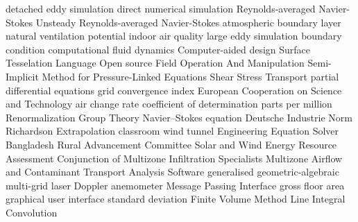		{detached eddy simulation}
		{direct numerical simulation}
		{Reynolds-averaged Navier-Stokes}
	{Unsteady Reynolds-averaged Navier-Stokes}
		{atmospheric boundary layer}
		{natural ventilation potential}
		{indoor air quality}
		{large eddy simulation}
			{boundary condition}
		{computational fluid dynamics}
		{Computer-aided design}
 		{Surface Tesselation Language}
 {Open source Field Operation And Manipulation}
	{Semi-Implicit Method for Pressure-Linked Equations}
		{Shear Stress Transport}
		{partial differential equations}
		{grid convergence index}
		{European Cooperation on Science and Technology}
		{air change rate}
		{coefficient of determination}
		{parts per million}
		{Renormalization Group Theory}
		{Navier–Stokes equation}
		{Deutsche Industrie Norm}
		    {Richardson Extrapolation}
			{classroom}
			{wind tunnel}
		{Engineering Equation Solver}
		{Bangladesh Rural Advancement Committee}
	{Solar and Wind Energy Resource Assessment}
 	{Conjunction of Multizone Infiltration Specialists}
	{Multizone Airflow and Contaminant Transport Analysis Software}
		{generalised geometric-algebraic multi-grid}
		{laser Doppler anemometer}
		{Message Passing Interface}
		{gross floor area}
		{graphical user interface}
			{standard deviation}
		{Finite Volume Method}
		{Line Integral Convolution}
















